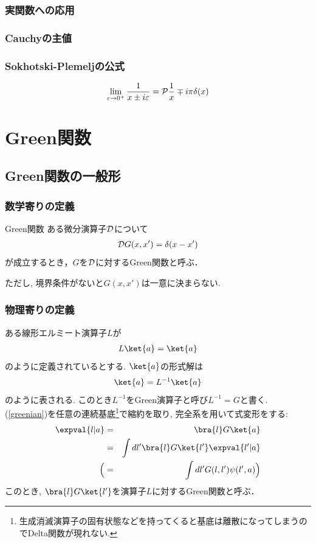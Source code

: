 \documentclass[10.5pt,a4paper]{jreport}
\begin{document}
\subsection{実関数への応用}
\subsection{Cauchyの主値}
\subsection{Sokhotski-Plemeljの公式}
\begin{eqnarray}
  \lim_{\varepsilon \rightarrow 0^+}\frac{1}{x \pm i\varepsilon} = {\cal P}\frac{1}{x} \mp i\pi\delta(x)
\end{eqnarray}

\newpage
\chapter{Green関数}
\section{Green関数の一般形}
\subsection{数学寄りの定義}
\begin{itembox}[c]{Green関数}
  ある微分演算子${\cal D}$について
  \begin{eqnarray}
    {\cal D}G(x, x') = \delta(x-x')
  \end{eqnarray}
  が成立するとき，$G$を${\cal D}$に対するGreen関数と呼ぶ．
\end{itembox}
ただし, 境界条件がないと$G(x, x')$は一意に決まらない.
\subsection{物理寄りの定義}
ある線形エルミート演算子$L$が
\begin{eqnarray}
  L\ket{a} = \ket{a}
\end{eqnarray}
のように定義されているとする. $\ket{a}$の形式解は
\begin{eqnarray}
  \ket{a} = L^{-1}\ket{a}\label{greenian}
\end{eqnarray}
のように表される. このとき$L^{-1}$をGreen演算子と呼び$L^{-1} = G$と書く. (\ref{greenian})を任意の連続基底\footnote{生成消滅演算子の固有状態などを持ってくると基底は離散になってしまうのでDelta関数が現れない.}で縮約を取り, 完全系を用いて式変形をする:
\begin{eqnarray}
  \expval{l|a} &=& \bra{l}G\ket{a}\\
  &=& \int dl' \bra{l}G\ket{l'}\expval{l'|a}\\
  \Bigl(&=& \int dl' G(l,l')\psi(l', a)\Bigr)
\end{eqnarray}
このとき, $\bra{l}G\ket{l'}$を演算子$L$に対するGreen関数と呼ぶ．
\end{document}
